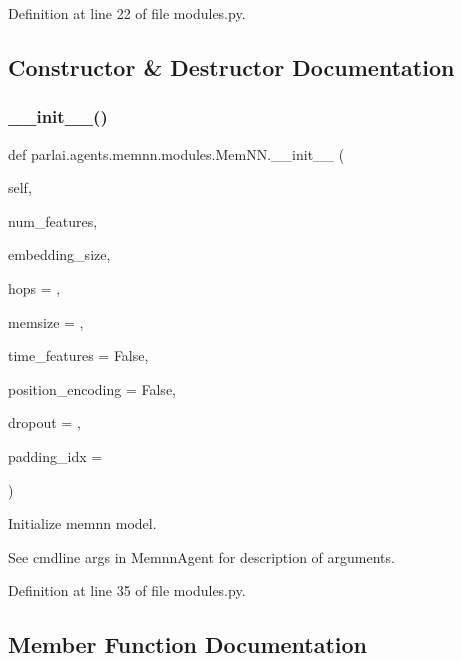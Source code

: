 Definition at line 22 of file modules.\+py.



\subsection{Constructor \& Destructor Documentation}
\mbox{\label{classparlai_1_1agents_1_1memnn_1_1modules_1_1MemNN_a8bfe18ec94ebe8fc68a4147a1ebcbcb4}} 
\subsubsection{\texorpdfstring{\+\_\+\+\_\+init\+\_\+\+\_\+()}{\_\_init\_\_()}}
{\footnotesize\ttfamily def parlai.\+agents.\+memnn.\+modules.\+Mem\+N\+N.\+\_\+\+\_\+init\+\_\+\+\_\+ (\begin{DoxyParamCaption}\item[{}]{self,  }\item[{}]{num\+\_\+features,  }\item[{}]{embedding\+\_\+size,  }\item[{}]{hops = {},  }\item[{}]{memsize = {},  }\item[{}]{time\+\_\+features = {\ttfamily False},  }\item[{}]{position\+\_\+encoding = {\ttfamily False},  }\item[{}]{dropout = {},  }\item[{}]{padding\+\_\+idx = {} }\end{DoxyParamCaption})}

\begin{DoxyVerb}Initialize memnn model.

See cmdline args in MemnnAgent for description of arguments.
\end{DoxyVerb}
 

Definition at line 35 of file modules.\+py.



\subsection{Member Function Documentation}
\mbox{\label{classparlai_1_1agents_1_1memnn_1_1modules_1_1MemNN_ab4402719d43be5dba7eb6a15074c0273}} 
